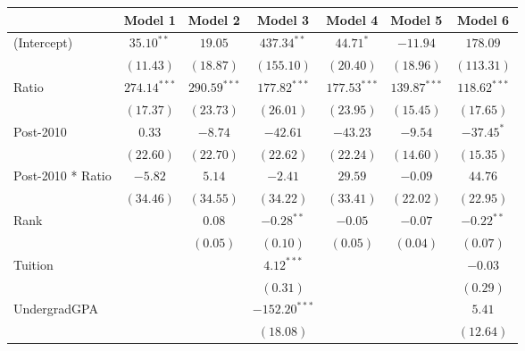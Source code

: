 \begin{table}
\begin{center}
\begin{tabular}{l c c c c c c }
\hline
                      & Model 1 & Model 2 & Model 3 & Model 4 & Model 5 & Model 6 \\
\hline
(Intercept)           & $35.10^{**}$   & $19.05$        & $437.34^{**}$   & $44.71^{*}$    & $-11.94$       & $178.09$       \\
                      & $(11.43)$      & $(18.87)$      & $(155.10)$      & $(20.40)$      & $(18.96)$      & $(113.31)$     \\
Ratio                 & $274.14^{***}$ & $290.59^{***}$ & $177.82^{***}$  & $177.53^{***}$ & $139.87^{***}$ & $118.62^{***}$ \\
                      & $(17.37)$      & $(23.73)$      & $(26.01)$       & $(23.95)$      & $(15.45)$      & $(17.65)$      \\
Post-2010             & $0.33$         & $-8.74$        & $-42.61$        & $-43.23$       & $-9.54$        & $-37.45^{*}$   \\
                      & $(22.60)$      & $(22.70)$      & $(22.62)$       & $(22.24)$      & $(14.60)$      & $(15.35)$      \\
Post-2010 * Ratio     & $-5.82$        & $5.14$         & $-2.41$         & $29.59$        & $-0.09$        & $44.76$        \\
                      & $(34.46)$      & $(34.55)$      & $(34.22)$       & $(33.41)$      & $(22.02)$      & $(22.95)$      \\
Rank                  &                & $0.08$         & $-0.28^{**}$    & $-0.05$        & $-0.07$        & $-0.22^{**}$   \\
                      &                & $(0.05)$       & $(0.10)$        & $(0.05)$       & $(0.04)$       & $(0.07)$       \\
Tuition               &                &                & $4.12^{***}$    &                &                & $-0.03$        \\
                      &                &                & $(0.31)$        &                &                & $(0.29)$       \\
UndergradGPA          &                &                & $-152.20^{***}$ &                &                & $5.41$         \\
                      &                &                & $(18.08)$       &                &                & $(12.64)$      \\

\end{tabular}
\end{center}
\end{table}
